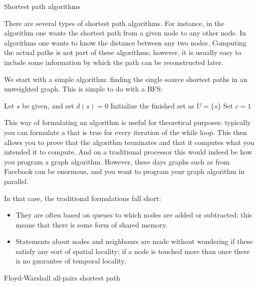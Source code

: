  {Shortest path algorithms}

There are several types of shortest path algorithms. For instance,
in the  algorithm
one wants the shortest path from a given node to any other node.
In  algorithms
one wants to know the distance between any two nodes.
Computing the actual paths is not part of these algorithms; 
however, it is usually easy to include some information by
which the path can be reconstructed later.

We start with a simple algorithm: finding the single source shortest
paths in an unweighted graph. This is simple to do with a \acf{BFS}:

\begin{displayalgorithm}
  Let $s$ be given, and set $d(s)=0$\;
  Initialize the finished set as $U=\{s\}$\;
  Set $c=1$\;
\end{displayalgorithm}

This way of formulating an algorithm is useful for theoretical purposes:
typically you can formulate a  that is true
for every iteration of the while loop. This then allows you to prove
that the algorithm terminates and that it computes what you intended it to compute.
And on a traditional processor this would indeed be how you program 
a graph algorithm. However, these days graphs such as from Facebook 
can be enormous, and you want to program your graph algorithm in
parallel.

In that case, the traditional formulations fall short:
\begin{itemize}
\item They are often based on queues to which nodes are added or subtracted; this means
  that there is some form of shared memory.
\item Statements about nodes and neighbours are made without wondering if these
  satisfy any sort of spatial locality; if a node is touched more than once there is
  no guarantee of temporal locality.
\end{itemize}

 {Floyd-Warshall all-pairs shortest path}
\label{sec:floyd}

